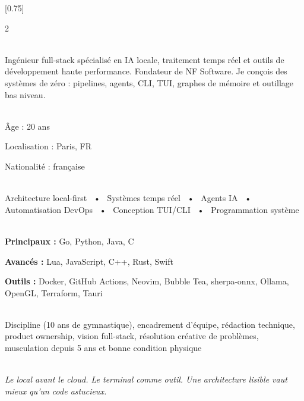 \documentclass[lighthipster]{simplehipstercv}
\begin{document}
\setlength{\columnsep}{1.5cm}
[0.75]
\begin{paracol}{2}

\paracolbackgroundoptions

\footnotesize
{\setasidefontcolour
\flushleft

\vspace{1em}

\\[0.5em]

{\footnotesize
Ingénieur full-stack spécialisé en IA locale, traitement temps réel et outils de développement haute performance. Fondateur de NF Software. Je conçois des systèmes de zéro : pipelines, agents, CLI, TUI, graphes de mémoire et outillage bas niveau.}
\bigskip

 \\[0.5em]
Âge : 20 ans

Localisation : Paris, FR

Nationalité : française

\bigskip

 \\[0.5em]

Architecture local-first ~•~
Systèmes temps réel ~•~
Agents IA ~•~
Automatisation DevOps ~•~
Conception TUI/CLI ~•~
Programmation système

\bigskip

\\[0.5em]

\textbf{Principaux :}
Go, Python, Java, C

\textbf{Avancés :}
Lua, JavaScript, C++, Rust, Swift

\textbf{Outils :}
Docker, GitHub Actions, Neovim, Bubble Tea, sherpa-onnx, Ollama, OpenGL, Terraform, Tauri

\bigskip

\\[0.5em]

Discipline (10 ans de gymnastique), encadrement d'équipe, rédaction technique, product ownership, vision full-stack, résolution créative de problèmes, musculation depuis 5 ans et bonne condition physique

\bigskip

\\[0.5em]

{\footnotesize\textit{Le local avant le cloud. Le terminal comme outil. Une architecture lisible vaut mieux qu'un code astucieux.}}

}
\end{paracol}
\end{document}
